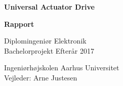 \documentclass[11pt, a4paper, twoside, openany]{memoir}
\date{}
\author{\forfatter}
\title{\titel}
\begin{document}
\begin{titlingpage}
		
		\begin{center}
				{\Huge\bfseries Universal Actuator Drive}\\
				\vspace{10pt}
				
				{\huge\bfseries Rapport}\\
				
				\vspace{20pt}
				
				{Diplomingeniør Elektronik}\\
				{\large Bachelorprojekt Efterår 2017}\\
				
				\vspace{10pt}
				
				Ingeniørhøjskolen Aarhus Universitet\\
				Vejleder: Arne Justesen
				\vspace{10pt}
				

\end{center}
\end{titlingpage}
\end{document}

